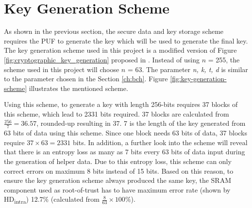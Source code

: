 
\section{Key Generation Scheme}\label{ch:key_generation_scheme}

As shown in the previous section, the secure data and key storage scheme requires the PUF to generate the key which will be used to generate the final key. The key generation scheme used in this project is a modified version of Figure \ref{fig:cryptographic_key_generation} proposed in \cite{cryptographic_key_generation}. Instead of using $n$ = 255, the scheme used in this project will choose $n$ = 63. The parameter \textit{n, k, t, d} is similar to the parameter chosen in the Section \ref{ch:bch}. Figure \ref{fig:key-generation-scheme} illustrates the mentioned scheme.

Using this scheme, to generate a key with length 256-bits requires 37 blocks of this scheme, which lead to 2331 bits required. 37 blocks are calculated from $\frac{256}{7}=36.57$, rounded-up resulting in 37. 7 is the length of the key generated from 63 bits of data using this scheme. Since one block needs 63 bits of data, 37 blocks require $37\times63=2331$ bits.
In addition, a further look into the scheme will reveal that there is an entropy loss as many as 7 bits every 63 bits of data input during the generation of helper data. Due to this entropy loss, this scheme can only correct errors on maximum 8 bits instead of 15 bits. Based on this reason, to ensure the key generation scheme always produced the same key, the SRAM component used as root-of-trust has to have maximum error rate (shown by HD\textsubscript{intra}) 12.7\% (calculated from $\frac{8}{63}\times100\%$).


